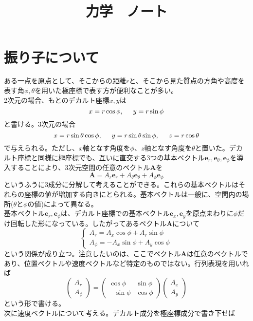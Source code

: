 \documentclass{jsarticle}
\title{力学　ノート}
\author{}
\date{}
\begin{document}
\maketitle
\section{振り子について}
ある一点を原点として、そこからの距離\(r\)と、そこから見た質点の方角や高度を表す角\(\phi,\theta\)を用いた極座標で表す方が便利なことが多い。\\
2次元の場合、もとのデカルト座標\(x,y\)は
\[x=r\cos\phi,\hspace{5mm}y=r\sin\phi\]
と書ける。3次元の場合
\[x=r\sin\theta\cos\phi,\hspace{5mm}y=r\sin\theta\sin\phi,\hspace{5mm}z=r\cos\theta\]
で与えられる。ただし、\(x\)軸となす角度を\(\phi\)、\(z\)軸となす角度を\(\theta\)と置いた。デカルト座標と同様に極座標でも、互いに直交する3つの基本ベクトル\(\bm{e}_{r},\bm{e}_{\theta},\bm{e}_{\phi}\)を導入することにより、3次元空間の任意のベクトル\(\bm{A}\)を
\[\bm{A}=A_{r}\bm{e}_{r}+A_{\theta}\bm{e}_{\theta}+A_{\phi}\bm{e}_{\phi}\]
というふうに3成分に分解して考えることができる。これらの基本ベクトルはそれらの座標の値が増加する向きにとられる。基本ベクトルは一般に、空間内の場所(\(\theta\)と\(\phi\)の値)によって異なる。\\
基本ベクトル\(\bm{e}_{r},\bm{e}_{\phi}\)は、デカルト座標での基本ベクトル\(\bm{e}_{x},\bm{e}_{y}\)を原点まわりに\(\phi\)だけ回転した形になっている。したがってあるベクトル\(\bm{A}\)について
\[\begin{cases}
A_{r}=A_{x}\cos\phi+A_{r}\sin\phi\\
A_{\phi}=-A_{x}\sin\phi+A_{y}\cos\phi\end{cases}\]
という関係が成り立つ。注意したいのは、ここでベクトル\(\bm{A}\)は任意のベクトルであり、位置ベクトルや速度ベクトルなど特定のものではない。行列表現を用いれば
\[\left(\begin{array}{c}
A_{r}\\
A_{\phi}\end{array}\right)=\left(\begin{array}{cc}
\cos\phi & \sin\phi \\
-\sin\phi & \cos\phi\end{array}\right)\left(\begin{array}{c}
A_{x}\\
A_{y}\end{array}\right)\]
という形で書ける。\\
次に速度ベクトルについて考える。デカルト成分を極座標成分で書き下せば
\end{document}
